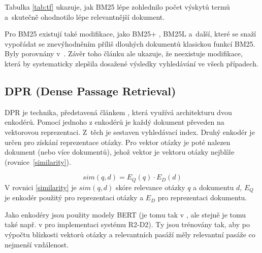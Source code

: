 Tabulka \ref{tab:tf} ukazuje, jak BM25 lépe zohlednilo počet výskytů termů a~skutečně ohodnotilo lépe relevantnější dokument.\par \medskip
Pro BM25 existují také modifikace, jako BM25+ \cite{bm25_too_long}, BM25L \cite{bm25_plus} a~další, které se snaží vypořádat se znevýhodněním příliš dlouhých dokumentů klasickou funkcí BM25. Byly porovnány v~\cite{bm25_improvements}. Závěr toho článku ale ukazuje, že neexistuje modifikace, která by systematicky zlepšila dosažené výsledky vyhledávání ve všech případech.\par

\subsection{DPR (Dense Passage Retrieval)}
\label{dpr}
DPR je technika, představená článkem \cite{dpr}, která využívá architekturu dvou enkodérů. Pomocí jednoho z enkodérů je  každý dokument převeden na vektorovou reprezentaci. Z~těch je sestaven vyhledávací index. Druhý enkodér je určen pro získání reprezentace otázky. Pro vektor otázky je poté nalezen dokument (nebo více dokumentů), jehož vektor je vektoru otázky nejblíže (rovnice~\ref{similarity}).\par
\begin{equation}
    \label{similarity}
    sim(q,d) = E_Q(q)\cdot E_D(d)
\end{equation}
V rovnici \ref{similarity} \cite{dpr} je $sim(q,d)$ skóre relevance otázky $q$ a dokumentu $d$, $E_Q$ je enkodér použitý pro reprezentaci otázky a $E_D$ pro reprezentaci dokumentu.\par
Jako enkodéry jsou použity modely BERT (je tomu tak v \cite{dpr}, ale stejně je tomu také např. v \cite{fajcik2021pruning} pro implementaci systému R2-D2). Ty jsou trénovány tak, aby po výpočtu blízkosti vektorů otázky a relevantních pasáží měly relevantní pasáže co nejmenší vzdálenost.


